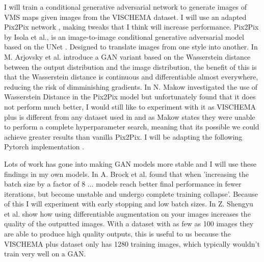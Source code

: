 \documentclass{UoYCSproject}
\begin{document}
I will train a conditional generative adversarial network to generate images of VMS maps given images from the VISCHEMA dataset. I will use an adapted Pix2Pix network \cite{isola2018imagetoimage}, making tweaks that I think will increase performance. 
Pix2Pix by Isola et al.\cite{isola2018imagetoimage}, is an image-to-image conditional generative adversarial model based on the UNet \cite{ronneberger2015unet}. Designed to translate images from one style into another. In \cite{arjovsky2017wasserstein} M. Arjovsky et al. introduce a GAN variant based on the Wasserstein distance between the output distribution and the image distribution, the benefit of this is that the Wasserstein distance is continuous and differentiable almost everywhere, reducing the risk of dimminishing gradients. In \cite{pix2pixwasserstein} N. Makow investigated the use of Wasserstein Distance in the Pix2Pix model but unfortunately found that it does not perform much better, I would still like to experiment with it as VISCHEMA plus is different from any dataset used in \cite{isola2018imagetoimage} and as Makow states they were unable to perform a complete hyperparameter search, meaning that its possible we could achieve greater results than vanilla Pix2Pix.
I will be adapting the following Pytorch implementation \cite{PytorchPix2Pix}. 

Lots of work has gone into making GAN models more stable and I will use these findings in my own models. In \cite{brock2019large} A. Brock et al. found that when 'increasing the batch size by a factor of 8 ... models reach better final performance in fewer iterations, but become unstable and undergo complete training collapse'. Because of this I will experiment with early stopping and low batch sizes.  In \cite{zhao2020differentiable} Z. Shengyu et al. show how using differentiable augmentation on your images increases the quality of the outputted images. With a dataset with as few as 100 images they are able to produce high quality outputs, this is useful to us because the VISCHEMA plus dataset only has 1280 training images, which typically wouldn't train very well on a GAN.
\end{document}
